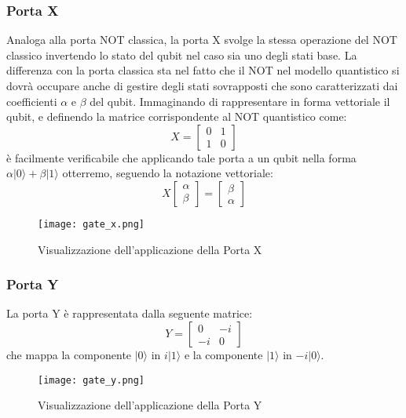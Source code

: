 \subsubsection{Porta X}
Analoga alla porta NOT classica, la porta X svolge la stessa operazione del NOT classico invertendo lo stato del qubit nel caso sia uno degli stati base. La differenza con la porta classica sta nel fatto che il NOT nel modello quantistico si dovrà occupare anche di gestire degli stati sovrapposti che sono caratterizzati dai coefficienti \( \alpha \) e \( \beta \) del qubit.
Immaginando di rappresentare in forma vettoriale il qubit, e definendo la matrice corrispondente al NOT quantistico come:
\[
  X = 
  \begin{bmatrix}
    0 & 1 \\
    1 & 0
  \end{bmatrix}
\]
è facilmente verificabile che applicando tale porta a un qubit nella forma \( \alpha | 0 \rangle + \beta | 1 \rangle \) otterremo, seguendo la notazione vettoriale:
\[
  X
  \begin{bmatrix}
    \alpha \\ \beta
  \end{bmatrix}
  =
  \begin{bmatrix}
    \beta \\ \alpha
  \end{bmatrix}
\]

\begin{figure}[h]
  \centering
  \texttt{[image: gate\_x.png]}
  \caption{Visualizzazione dell'applicazione della Porta X}
  \label{fig:gate_x}
\end{figure}

\subsubsection{Porta Y}
La porta Y è rappresentata dalla seguente matrice:
\[
  Y
  =
  \begin{bmatrix}
    0 & -i \\
    -i & 0
  \end{bmatrix}
\]
che mappa la componente \( | 0 \rangle \) in \( i | 1 \rangle \) e la componente \( | 1 \rangle \) in \( -i | 0 \rangle \).

\begin{figure}[h]
  \centering
  \texttt{[image: gate\_y.png]}
  \caption{Visualizzazione dell'applicazione della Porta Y}
  \label{fig:gate_y}
\end{figure}

